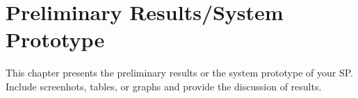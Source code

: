 \chapter{Preliminary Results/System Prototype}
This chapter  presents the preliminary results or the system prototype of your SP.  Include screenhots, tables, or graphs and provide the discussion of results.